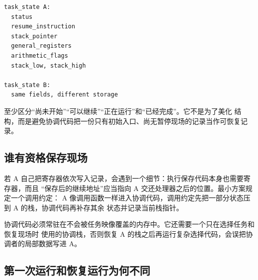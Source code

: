\begin{lstlisting}
task_state A:
  status
  resume_instruction
  stack_pointer
  general_registers
  arithmetic_flags
  stack_low, stack_high

task_state B:
  same fields, different storage
\end{lstlisting}

 至少区分“尚未开始”“可以继续”“正在运行”和“已经完成”。它不是为了美化
结构，而是避免协调代码把一份只有初始入口、尚无暂停现场的记录当作可恢复记录。

\subsection{谁有资格保存现场}

若 A 自己把寄存器依次写入记录，会遇到一个细节：执行保存代码本身也需要寄存器，而且
“保存后的继续地址”应当指向 A 交还处理器之后的位置。最小方案规定一个调用约定：
A 像调用函数一样进入协调代码，调用约定先把一部分状态压到 A 的栈，协调代码再补存其余
状态并记录当前栈指针。

协调代码必须常驻在不会被任务映像覆盖的内存中。它还需要一个只在选择任务和恢复现场时
使用的协调栈，否则恢复 A 的栈之后再运行复杂选择代码，会误把协调者的局部数据写进 A。

\begin{center}
\end{center}

\subsection{第一次运行和恢复运行为何不同}

